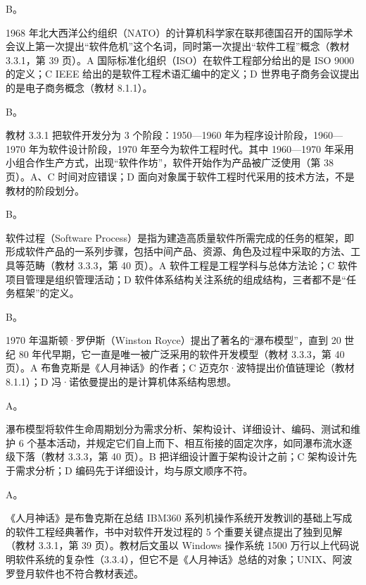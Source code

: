 \documentclass[a4paper,11pt]{article}
\begin{document}


\q B。\begin{analysis}1968 年北大西洋公约组织（NATO）的计算机科学家在联邦德国召开的国际学术会议上第一次提出“软件危机”这个名词，同时第一次提出“软件工程”概念（教材 3.3.1，第 39 页）。A 国际标准化组织（ISO）在软件工程部分给出的是 ISO 9000 的定义；C IEEE 给出的是软件工程术语汇编中的定义；D 世界电子商务会议提出的是电子商务概念（教材 8.1.1）。\end{analysis}

\q B。\begin{analysis}教材 3.3.1 把软件开发分为 3 个阶段：1950—1960 年为程序设计阶段，1960—1970 年为软件设计阶段，1970 年至今为软件工程时代。其中 1960—1970 年采用小组合作生产方式，出现“软件作坊”，软件开始作为产品被广泛使用（第 38 页）。A、C 时间对应错误；D 面向对象属于软件工程时代采用的技术方法，不是教材的阶段划分。\end{analysis}

\q B。\begin{analysis}软件过程（Software Process）是指为建造高质量软件所需完成的任务的框架，即形成软件产品的一系列步骤，包括中间产品、资源、角色及过程中采取的方法、工具等范畴（教材 3.3.3，第 40 页）。A 软件工程是工程学科与总体方法论；C 软件项目管理是组织管理活动；D 软件体系结构关注系统的组成结构，三者都不是“任务框架”的定义。\end{analysis}

\q B。\begin{analysis}1970 年温斯顿·罗伊斯（Winston Royce）提出了著名的“瀑布模型”，直到 20 世纪 80 年代早期，它一直是唯一被广泛采用的软件开发模型（教材 3.3.3，第 40 页）。A 布鲁克斯是《人月神话》的作者；C 迈克尔·波特提出价值链理论（教材 8.1.1）；D 冯·诺依曼提出的是计算机体系结构思想。\end{analysis}

\q A。\begin{analysis}瀑布模型将软件生命周期划分为需求分析、架构设计、详细设计、编码、测试和维护 6 个基本活动，并规定它们自上而下、相互衔接的固定次序，如同瀑布流水逐级下落（教材 3.3.3，第 40 页）。B 把详细设计置于架构设计之前；C 架构设计先于需求分析；D 编码先于详细设计，均与原文顺序不符。\end{analysis}

\q A。\begin{analysis}《人月神话》是布鲁克斯在总结 IBM360 系列机操作系统开发教训的基础上写成的软件工程经典著作，书中对软件开发过程的 5 个重要关键点提出了独到见解（教材 3.3.1，第 39 页）。教材后文虽以 Windows 操作系统 1500 万行以上代码说明软件系统的复杂性（3.3.4），但它不是《人月神话》总结的对象；UNIX、阿波罗登月软件也不符合教材表述。\end{analysis}
\end{document}
